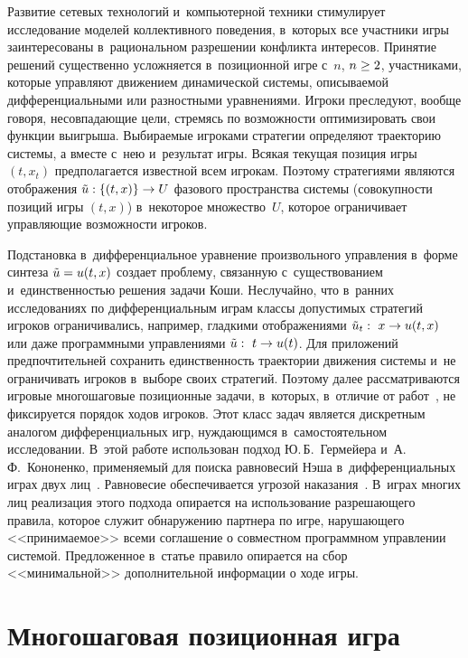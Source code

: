 \begin{multicols}{2}
    Развитие сетевых технологий и~компьютерной техники стимулирует 
исследование моделей коллективного поведения, в~которых все участники игры 
заинтересованы в~рациональном разрешении конфликта интересов. Принятие 
решений существенно усложняется в~позиционной игре с~$n$, $n\hm\geq 2$, 
участниками, которые управляют движением динамической системы, описываемой 
дифференциальными или разностными уравнениями. Игроки преследуют, вообще 
говоря, несовпадающие цели, стремясь по возможности оптимизировать свои 
функции выигрыша. Выбираемые игроками стратегии определяют траекторию 
системы, а вместе с~нею и~результат игры. Всякая текущая позиция игры $(t,x_t)$ 
предполагается известной всем игрокам. Поэтому стратегиями являются 
отображения $\tilde{u}: \{ (t,x)\}\hm\to U$ фазового пространства системы\linebreak 
(совокупности позиций игры $(t,x)$) в~некоторое множество~$U$, которое 
ограничивает управляющие возможности игроков. 
    
    Подстановка в~дифференциальное уравнение произвольного управления 
в~форме синтеза $\tilde{u}\hm= u(t,x)$ создает проблему, связанную с~существованием 
и~единственностью решения задачи Коши. Неслучайно, что в~ранних 
исследованиях по дифференциальным играм классы допустимых стратегий игроков 
ограничивались, например, гладкими отоб\-ра\-же\-ни\-ями $\tilde{u}_t:\ x\hm\to u(t,x)$ 
или даже про\-грам\-мны\-ми управ\-ле\-ни\-ями $\tilde{u}:\ t\hm\to u(t)$. Для приложений 
предпочтительней сохранить единственность траектории движения системы и~не 
ограничивать игроков в~выборе своих стратегий. Поэтому далее рассматриваются 
игровые многошаговые позиционные задачи, в~которых, в~отличие от  
работ~\cite{9-vas, 15-vas}, не фиксируется порядок ходов игроков. Этот класс задач 
является дискретным аналогом дифференциальных игр, нуждающимся 
в~самостоятельном исследовании. В~этой работе использован подход 
Ю.\,Б.~Гермейера и~А.\,Ф.~Кононенко, применяемый для поиска равновесий Нэша 
в~дифференциальных играх двух лиц~\cite{12-vas, 10-vas}. Равновесие 
обеспечивается угрозой наказания~\cite{1-vas, 9-vas, 10-vas, 11-vas, 12-vas, 13-vas}. 
В~играх многих лиц реализация этого подхода опирается на ис\-поль\-зование 
разрешающего правила, которое служит обна\-ружению партнера по игре, 
нарушающего <<принимаемое>> всеми соглашение о совместном программном 
управ\-ле\-нии сис\-те\-мой. Предложенное в~статье правило опирается на сбор 
<<минимальной>> дополнительной информации о ходе игры.

\section{Многошаговая позиционная игра }


\end{multicols}
